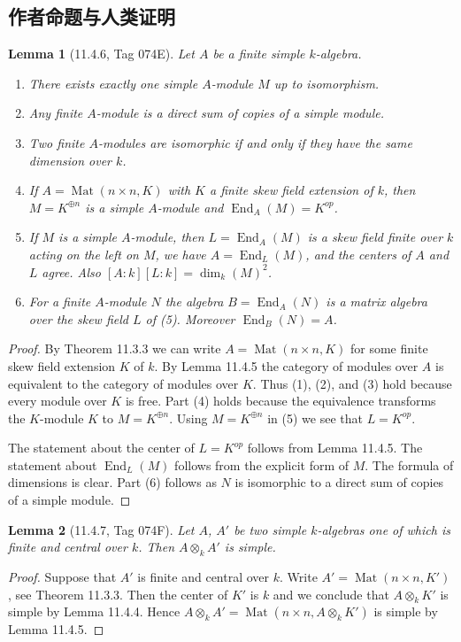 \documentclass[UTF8,11pt]{ctexart}
\newtheorem*{lemma}{Lemma}
\theoremstyle{definition}
\begin{document}
\subsection*{作者命题与人类证明}
\begin{lemma}[11.4.6, Tag 074E]
Let $A$ be a finite simple $k$-algebra.
\begin{enumerate}
\item There exists exactly one simple $A$-module $M$ up to isomorphism.
\item Any finite $A$-module is a direct sum of copies of a simple module.
\item Two finite $A$-modules are isomorphic if and only if they have the same dimension over $k$.
\item If $A=\operatorname{Mat}(n\times n,K)$ with $K$ a finite skew field extension of $k$, then $M=K^{\oplus n}$ is a simple $A$-module and $\operatorname{End}_A(M)=K^{op}$.
\item If $M$ is a simple $A$-module, then $L=\operatorname{End}_A(M)$ is a skew field finite over $k$ acting on the left on $M$, we have $A=\operatorname{End}_L(M)$, and the centers of $A$ and $L$ agree. Also $[A:k][L:k]=\dim_k(M)^2$.
\item For a finite $A$-module $N$ the algebra $B=\operatorname{End}_A(N)$ is a matrix algebra over the skew field $L$ of (5). Moreover $\operatorname{End}_B(N)=A$.
\end{enumerate}
\end{lemma}
\begin{proof}
By Theorem 11.3.3 we can write $A=\operatorname{Mat}(n\times n,K)$ for some finite skew field extension $K$ of $k$. By Lemma 11.4.5 the category of modules over $A$ is equivalent to the category of modules over $K$. Thus (1), (2), and (3) hold because every module over $K$ is free. Part (4) holds because the equivalence transforms the $K$-module $K$ to $M=K^{\oplus n}$. Using $M=K^{\oplus n}$ in (5) we see that $L=K^{op}$.

The statement about the center of $L=K^{op}$ follows from Lemma 11.4.5. The statement about $\operatorname{End}_L(M)$ follows from the explicit form of $M$. The formula of dimensions is clear. Part (6) follows as $N$ is isomorphic to a direct sum of copies of a simple module.
\end{proof}

\begin{lemma}[11.4.7, Tag 074F]
Let $A$, $A'$ be two simple $k$-algebras one of which is finite and central over $k$. Then $A\otimes_k A'$ is simple.
\end{lemma}
\begin{proof}
Suppose that $A'$ is finite and central over $k$. Write $A'=\operatorname{Mat}(n\times n,K')$, see Theorem 11.3.3. Then the center of $K'$ is $k$ and we conclude that $A\otimes_k K'$ is simple by Lemma 11.4.4. Hence $A\otimes_k A'=\operatorname{Mat}(n\times n,A\otimes_k K')$ is simple by Lemma 11.4.5.
\end{proof}
\end{document}
